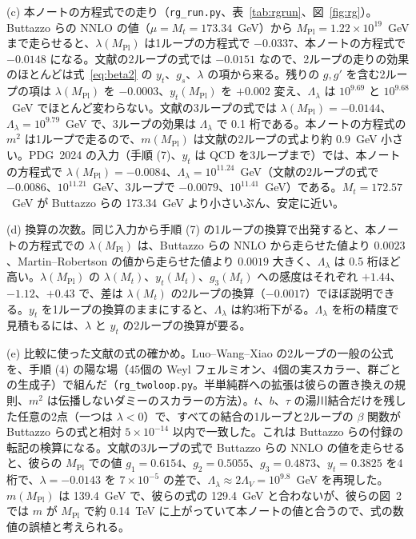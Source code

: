 \documentclass[a4paper,10pt]{ltjsarticle}
\begin{document}
(c) 本ノートの方程式での走り（\texttt{rg\_run.py}、表~\ref{tab:rgrun}、図~\ref{fig:rg}）。Buttazzo らの NNLO の値（$\mu=M_t=173.34$~GeV）から $M_{\mathrm{Pl}}=1.22\times10^{19}$~GeV まで走らせると、$\lambda(M_{\mathrm{Pl}})$ は1ループの方程式で $-0.0337$、本ノートの方程式で $-0.0148$ になる。文献の2ループの式では $-0.0151$ なので、2ループの走りの効果のほとんどは式~\eqref{eq:beta2} の $y_t$、$g_s$、$\lambda$ の項から来る。残りの $g,g'$ を含む2ループの項は $\lambda(M_{\mathrm{Pl}})$ を $-0.0003$、$y_t(M_{\mathrm{Pl}})$ を $+0.002$ 変え、$\Lambda_\lambda$ は $10^{9.69}$ と $10^{9.68}$~GeV でほとんど変わらない。文献の3ループの式では $\lambda(M_{\mathrm{Pl}})=-0.0144$、$\Lambda_\lambda=10^{9.79}$~GeV で、3ループの効果は $\Lambda_\lambda$ で 0.1 桁である。本ノートの方程式の $m^2$ は1ループで走るので、$m(M_{\mathrm{Pl}})$ は文献の2ループの式より約 0.9~GeV 小さい。PDG~2024 の入力（手順 (7)、$y_t$ は QCD を3ループまで）では、本ノートの方程式で $\lambda(M_{\mathrm{Pl}})=-0.0084$、$\Lambda_\lambda=10^{11.24}$~GeV（文献の2ループの式で $-0.0086$、$10^{11.21}$~GeV、3ループで $-0.0079$、$10^{11.41}$~GeV）である。$M_t=172.57$~GeV が Buttazzo らの 173.34~GeV より小さいぶん、安定に近い。

(d) 換算の次数。同じ入力から手順 (7) の1ループの換算で出発すると、本ノートの方程式での $\lambda(M_{\mathrm{Pl}})$ は、Buttazzo らの NNLO から走らせた値より $0.0023$、Martin--Robertson の値から走らせた値より $0.0019$ 大きく、$\Lambda_\lambda$ は 0.5 桁ほど高い。$\lambda(M_{\mathrm{Pl}})$ の $\lambda(M_t)$、$y_t(M_t)$、$g_3(M_t)$ への感度はそれぞれ $+1.44$、$-1.12$、$+0.43$ で、差は $\lambda(M_t)$ の2ループの換算（$-0.0017$）でほぼ説明できる。$y_t$ を1ループの換算のままにすると、$\Lambda_\lambda$ は約3桁下がる。$\Lambda_\lambda$ を桁の精度で見積もるには、$\lambda$ と $y_t$ の2ループの換算が要る。

(e) 比較に使った文献の式の確かめ。Luo--Wang--Xiao の2ループの一般の公式を、手順 (4) の陽な場（45個の Weyl フェルミオン、4個の実スカラー、群ごとの生成子）で組んだ（\texttt{rg\_twoloop.py}。半単純群への拡張は彼らの置き換えの規則、$m^2$ は伝播しないダミーのスカラーの方法）。$t$、$b$、$\tau$ の湯川結合だけを残した任意の2点（一つは $\lambda<0$）で、すべての結合の1ループと2ループの $\beta$ 関数が Buttazzo らの式と相対 $5\times10^{-14}$ 以内で一致した。これは Buttazzo らの付録の転記の検算になる。文献の3ループの式で Buttazzo らの NNLO の値を走らせると、彼らの $M_{\mathrm{Pl}}$ での値 $g_1=0.6154$、$g_2=0.5055$、$g_3=0.4873$、$y_t=0.3825$ を4桁で、$\lambda=-0.0143$ を $7\times10^{-5}$ の差で、$\Lambda_\lambda\approx2\Lambda_V=10^{9.8}$~GeV を再現した。$m(M_{\mathrm{Pl}})$ は 139.4~GeV で、彼らの式の 129.4~GeV と合わないが、彼らの図~2 では $m$ が $M_{\mathrm{Pl}}$ で約 0.14~TeV に上がっていて本ノートの値と合うので、式の数値の誤植と考えられる。
\end{document}
